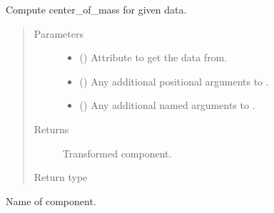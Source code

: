\documentclass[letterpaper,10pt,english]{sphinxmanual}
\begin{document}
\begin{fulllineitems}
\begin{fulllineitems}
\label{\detokenize{api/states:geology.src.States.center_of_mass}}
Compute center\_of\_mass for given data.
\begin{quote}\begin{description}
\item[{Parameters}] \leavevmode\begin{itemize}
\item {} 
 (\sphinxstyleliteralemphasis{\sphinxupquote{, }}) \textendash{} Attribute to get the data from.

\item {} 
 () \textendash{} Any additional positional arguments to .

\item {} 
 () \textendash{} Any additional named arguments to .

\end{itemize}

\item[{Returns}] \leavevmode
{} \textendash{} Transformed component.

\item[{Return type}] \leavevmode
{\hyperref[\detokenize{api/base_classes:geology.src.base_spatial.SpatialComponent}]{}}

\end{description}\end{quote}

\end{fulllineitems}


\begin{fulllineitems}
\label{\detokenize{api/states:geology.src.States.class_name}}
Name of component.


\end{fulllineitems}
\end{fulllineitems}
\end{document}
